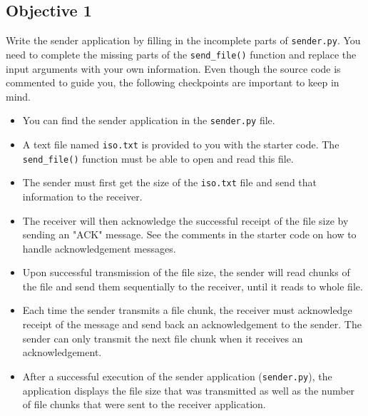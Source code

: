 \documentclass[11pt]{article}
\begin{document}


\subsection{Objective 1}
\label{subsec:obj1}
Write the sender application by filling in the incomplete parts of \texttt{sender.py}.
You need to complete the missing parts of the \texttt{send\_file()} function and replace the input arguments with your own information.
Even though the source code is commented to guide you, the following checkpoints are important to keep in mind.
\begin{itemize}
    \item You can find the sender application in the \texttt{sender.py} file.
    \item A text file named \texttt{iso.txt} is provided to you with the starter code. The \texttt{send\_file()} function must be able to open and read this file.
    \item The sender must first get the size of the \texttt{iso.txt} file and send that information to the receiver.
    \item The receiver will then acknowledge the successful receipt of the file size by sending an "ACK" message. See the comments in the starter code on how to handle acknowledgement messages.
    \item Upon successful transmission of the file size, the sender will read chunks of the file and send them sequentially to the receiver, until it reads to whole file.
    \item Each time the sender transmits a file chunk, the receiver must acknowledge receipt of the message and send back an acknowledgement to the sender. The sender can only transmit the next file chunk when it receives an acknowledgement.
    \item After a successful execution of the sender application (\texttt{sender.py}), the application displays the file size that was transmitted as well as the number of file chunks that were sent to the receiver application.
\end{itemize}
\end{document}
